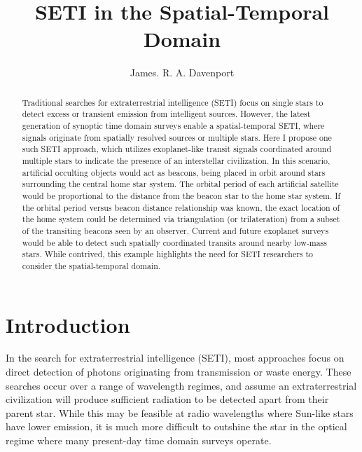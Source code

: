 \documentclass[modern]{aastex62}
\begin{document}
\title{SETI in the Spatial-Temporal Domain}



\author{James. R. A. Davenport}


\begin{abstract}
Traditional searches for extraterrestrial intelligence (SETI) focus on single stars to detect excess or transient emission from intelligent sources. However, the latest generation of synoptic time domain surveys enable a spatial-temporal SETI, where signals originate from spatially resolved sources or multiple stars. Here I propose one such SETI approach, which utilizes exoplanet-like transit signals coordinated around multiple stars to indicate the presence of an interstellar civilization. In this scenario, artificial occulting objects would act as beacons, being placed in orbit around stars surrounding the central home star system. The orbital period of each artificial satellite would be proportional to the distance from the beacon star to the home star system. If the orbital period versus beacon distance relationship was known, the exact location of the home system could be determined via triangulation (or trilateration) from a subset of the transiting beacons seen by an observer. Current and future exoplanet surveys would be able to detect such spatially coordinated transits around nearby low-mass stars. While contrived, this example highlights the need for SETI researchers to consider the spatial-temporal domain.
\end{abstract}



\section{Introduction}

In the search for extraterrestrial intelligence (SETI), most approaches focus on direct detection of photons originating from transmission or waste energy. These searches occur over a range of wavelength regimes, and assume an extraterrestrial civilization will produce sufficient radiation to be detected apart from their parent star. While this may be feasible at radio wavelengths where Sun-like stars have lower emission, it is much more difficult to outshine the star in the optical regime where many present-day time domain surveys operate. 
\end{document}
